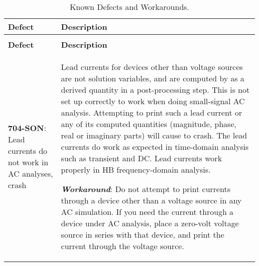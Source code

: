 



{
\small

\begin{longtable}[h] {>{\raggedright\small}m{2in}|>{\raggedright\let\\\tabularnewline\small}m{3.5in}}
  \caption{Known Defects and Workarounds.} \\ \hline
  \rowcolor{XyceDarkBlue} \color{white}\bf Defect & \color{white}\bf Description
  \\ \hline \endfirsthead
  \caption[]{Known Defects and Workarounds.} \\ \hline
  \rowcolor{XyceDarkBlue} \color{white}\bf Defect & \color{white}\bf Description
  \\ \hline \endhead

%
%  

\textbf{704-SON}: Lead currents do not work in AC analyses, crash \Xyce{} & Lead currents for devices other than voltage sources are not solution variables, and are computed by \Xyce{} as a derived quantity in a post-processing step.  This is not set up correctly to work when doing small-signal AC analysis.  Attempting to print such a lead current or any of its computed quantities (magnitude, phase, real or imaginary parts) will cause \Xyce{} to crash.  The lead currents do work as expected in time-domain analysis such as transient and DC.  Lead currents work properly in HB frequency-domain analysis.

\textbf{\textit{Workaround}}: Do not attempt to print currents through a device other than a voltage source in any AC simulation.  If you need the current through a device under AC analysis, place a zero-volt voltage source in series with that device, and print the current through the voltage source.  
\\ \hline


\end{longtable}}
